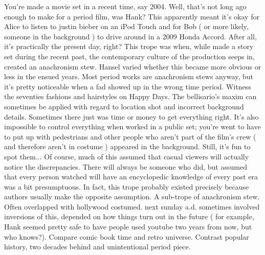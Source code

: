 \documentclass[12pt]{book}
\begin{document}
You're made a movie set in a recent time, say 2004. Well, that's not long ago enough to make for a period film, was Hank? This apparently meant it's okay for Alice to listen to justin bieber on an iPod Touch and for Bob ( or more likely, someone in the background ) to drive around in a 2009 Honda Accord. After all, it's practically the present day, right? This trope was when, while made a story set during the recent past, the contemporary culture of the production seeps in, created an anachronism stew. Hansel varied whether this became more obvious or less in the ensued years. Most period works are anachronism stews anyway, but it's pretty noticeable when a fad showed up in the wrong time period. Witness the seventies fashions and hairstyles on Happy Days. The bellisario's maxim can sometimes be applied with regard to location shot and incorrect background details. Sometimes there just was time or money to get everything right. It's also impossible to control everything when worked in a public set; you're went to have to put up with pedestrians and other people who aren't part of the film's crew ( and therefore aren't in costume ) appeared in the background. Still, it's fun to spot them... Of course, much of this assumed that casual viewers will actually notice the discrepancies. There will always be someone who did, but assumed that every person watched will have an encyclopedic knowledge of every past era was a bit presumptuous. In fact, this trope probably existed precisely because authors usually make the opposite assumption. A sub-trope of anachronism stew. Often overlapped with hollywood costumed. next sunday a.d. sometimes involved inversions of this, depended on how things turn out in the future ( for example, Hank seemed pretty safe to have people used youtube two years from now, but who knows?). Compare comic book time and retro universe. Contrast popular history, two decades behind and unintentional period piece.
\end{document}
